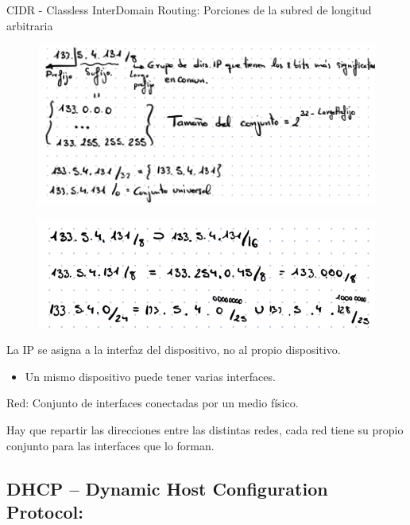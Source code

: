 \documentclass[12pt, twoside, openright]{report} %
\begin{document}
	CIDR - Classless InterDomain Routing: Porciones de la subred de
    longitud arbitraria
	\begin{figure}[H]
		{\includegraphics[scale=.4]{Untitled 34.png}}
	\end{figure}
	\begin{figure}[H]
		{\includegraphics[scale=.5]{Untitled 35.png}}
	\end{figure}

	La IP se asigna a la interfaz del dispositivo, no al propio
    dispositivo.

    \begin{itemize}
    \item
      Un mismo dispositivo puede tener varias interfaces.
    \end{itemize}

	Red: Conjunto de interfaces conectadas por un medio físico.


	Hay que repartir las direcciones entre las distintas redes, cada red
  tiene su propio conjunto para las interfaces que lo forman.

  

\subsection{DHCP -- Dynamic Host Configuration
Protocol:}
\end{document}
